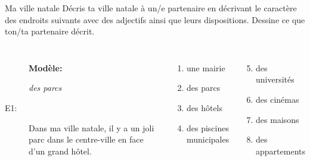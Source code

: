 \begin{frame}{Ma ville natale}
  Décris ta ville natale à un/e partenaire en décrivant le caractère des endroits suivants avec des adjectifs ainsi que leurs dispositions.
  Dessine ce que ton/ta partenaire décrit. \\
  \vspace{0.25cm}
  \begin{columns}[t]
      \begin{description}
        \item[] \textbf{Modèle:}
        \item[] \emph{des parcs}
        \item[E1:] Dans ma ville natale, il y a un joli parc dans le centre-ville en face d'un grand hôtel.
      \end{description}
      \begin{enumerate}
        \item une mairie
        \item des parcs
        \item des hôtels
        \item des piscines municipales
      \end{enumerate}
      \begin{enumerate}
        \setcounter{enumi}{4}
        \item des universités
        \item des cinémas
        \item des maisons
        \item des appartements
      \end{enumerate}
  \end{columns}
\end{frame}